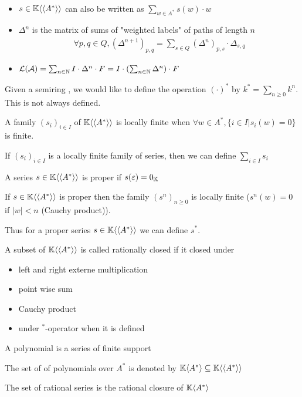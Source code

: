 \begin{property}~
	\begin{itemize}
		\item $s\in\mathbb{K}\langle\langle A^*\rangle\rangle$ can also be written as
			$\sum_{w\in A^*} s(w)\cdot w$
		\item $\Delta^n$ is the matrix of sums of "weighted labels" of
			paths of length $n$
			\begin{align*}
				\forall p, q \in Q, (\Delta^{n+1})_{p,q} = 
				\sum_{s\in Q} (\Delta^n)_{p, s} \cdot \Delta_{s, q}
			\end{align*}
		\item $\mathcal{L}(\mathcal{A}) = \sum_{n\in\mathbb{N}} I \cdot \Delta^n \cdot F =
			I \cdot (\sum_{n\in\mathbb{N}}\Delta^n)\cdot F$
	\end{itemize}
\end{property}

Given a semiring \KK, we would like to define the operation $( \cdot)^* $ by
$k^* = \sum_{n \geq 0} k^n$.
This is not always defined.

\begin{definition}
	A family $(s_i)_{i\in I}$ of $\mathbb{K}\langle\langle A^*\rangle\rangle$ is locally finite
	when $\forall w \in A^*, \{i \in I | s_i(w) = 0\}$ is finite.
\end{definition}
\begin{theorem}
	If $(s_i)_{i\in I}$ is a locally finite family of series, then
	we can define $\sum_{i\in I} s_i$
\end{theorem}
\begin{definition}
	A series $s \in \mathbb{K}\langle\langle A^*\rangle\rangle$ is proper if $s(\varepsilon) = 0_{\mathbb{K}}$
\end{definition}

If $s \in \mathbb{K}\langle\langle A^*\rangle\rangle$ is proper then the family $(s^n)_{n\geq 0}$ is locally
finite ($s^n(w) = 0$ if $|w|< n$ (Cauchy product)).

Thus for a proper series $s \in \mathbb{K}\langle\langle A^*\rangle\rangle$ we can define $s^*$.

\begin{definition} A subset of $\mathbb{K}\langle\langle A^*\rangle\rangle$ is called
	rationally closed if it closed under
	\begin{itemize}
		\item left and right externe multiplication
		\item point wise sum
		\item Cauchy product
		\item under $^*$-operator when it is defined
	\end{itemize}
\end{definition}

\begin{definition}
	A polynomial is a series of finite support

	The set of of polynomials over $A^*$ is denoted by
	$\mathbb{K}\langle A^*\rangle \subseteq \mathbb{K}\langle\langle A^*\rangle\rangle$

	The set of rational series is the rational closure of $\mathbb{K}\langle A^*\rangle$

\end{definition}



